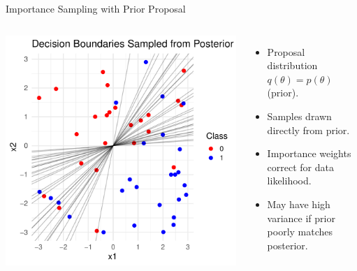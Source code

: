 \documentclass{beamer}
\begin{document}
\begin{frame}{Importance Sampling with Prior Proposal}
\begin{columns}
  \centering
  \includegraphics[width=\textwidth]{figures/importance_sampling_from_prior.pdf}

  \small
  \begin{itemize}
    \item Proposal distribution \( q(\theta) = p(\theta) \) (prior).
    \item Samples drawn directly from prior.
    \item Importance weights correct for data likelihood.
    \item May have high variance if prior poorly matches posterior.
  \end{itemize}
\end{columns}
\end{frame}
\end{document}
